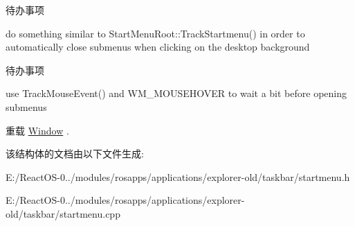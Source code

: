 \begin{DoxyRefDesc}{待办事项}
\item[\hyperlink{todo__todo000061}{待办事项}]do something similar to Start\+Menu\+Root\+::\+Track\+Startmenu() in order to automatically close submenus when clicking on the desktop background \end{DoxyRefDesc}


\begin{DoxyRefDesc}{待办事项}
\item[\hyperlink{todo__todo000062}{待办事项}]use Track\+Mouse\+Event() and W\+M\+\_\+\+M\+O\+U\+S\+E\+H\+O\+V\+ER to wait a bit before opening submenus \end{DoxyRefDesc}


重载 \hyperlink{struct_window}{Window} .



该结构体的文档由以下文件生成\+:\begin{DoxyCompactItemize}
\item 
E\+:/\+React\+O\+S-\/0../modules/rosapps/applications/explorer-\/old/taskbar/startmenu.\+h\item 
E\+:/\+React\+O\+S-\/0../modules/rosapps/applications/explorer-\/old/taskbar/startmenu.\+cpp\end{DoxyCompactItemize}
